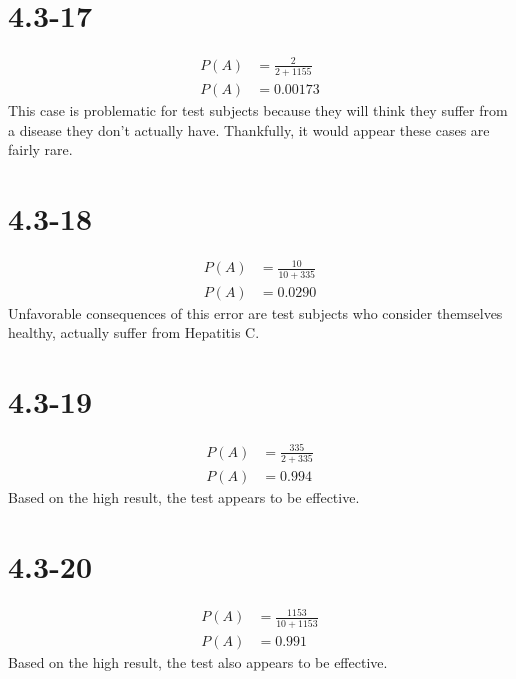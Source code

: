 \documentclass[12pt,fleqn]{article}
\newcommand{\chapter}{4.3}
\newcommand{\problem}[1]{\vspace{5ex}\section*{\chapter-#1}}
\begin{document}
\problem{17}
\begin{align*}
  P(A) &= \frac{2}{2 + 1155} \\
  P(A) &= 0.00173
\end{align*}
This case is problematic for test subjects because they will think they suffer from a disease they don't actually have. Thankfully, it would appear these cases are fairly rare.


\problem{18}
\begin{align*}
  P(A) &= \frac{10}{10 + 335} \\
  P(A) &= 0.0290
\end{align*}
Unfavorable consequences of this error are test subjects who consider themselves healthy, actually suffer from Hepatitis C.


\problem{19}
\begin{align*}
  P(A) &= \frac{335}{2 + 335} \\
  P(A) &= 0.994
\end{align*}
Based on the high result, the test appears to be effective.

\problem{20}
\begin{align*}
  P(A) &= \frac{1153}{10 + 1153} \\
  P(A) &= 0.991
\end{align*}
Based on the high result, the test also appears to be effective.
\end{document}
